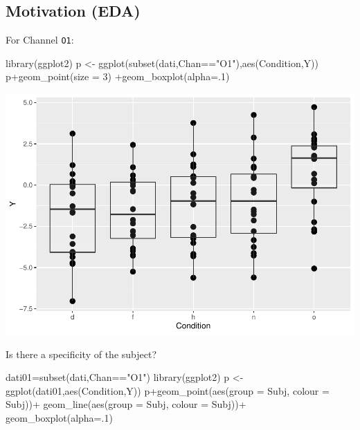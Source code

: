 \documentclass[
]{article}
\newenvironment{Shaded}{\begin{snugshade}}{\end{snugshade}}
\newcommand{\AttributeTok}[1]{\textcolor[rgb]{0.77,0.63,0.00}{#1}}
\newcommand{\DecValTok}[1]{\textcolor[rgb]{0.00,0.00,0.81}{#1}}
\newcommand{\FunctionTok}[1]{\textcolor[rgb]{0.00,0.00,0.00}{#1}}
\newcommand{\NormalTok}[1]{#1}
\newcommand{\OtherTok}[1]{\textcolor[rgb]{0.56,0.35,0.01}{#1}}
\newcommand{\SpecialCharTok}[1]{\textcolor[rgb]{0.00,0.00,0.00}{#1}}
\newcommand{\StringTok}[1]{\textcolor[rgb]{0.31,0.60,0.02}{#1}}
\begin{document}
\hypertarget{motivation-eda}{%
\subsection{Motivation (EDA)}\label{motivation-eda}}

For Channel \texttt{O1}:

\begin{Shaded}
\begin{Highlighting}[]
\FunctionTok{library}\NormalTok{(ggplot2)}
\NormalTok{p }\OtherTok{\textless{}{-}} \FunctionTok{ggplot}\NormalTok{(}\FunctionTok{subset}\NormalTok{(dati,Chan}\SpecialCharTok{==}\StringTok{"O1"}\NormalTok{),}\FunctionTok{aes}\NormalTok{(Condition,Y))}
\NormalTok{p}\SpecialCharTok{+}\FunctionTok{geom\_point}\NormalTok{(}\AttributeTok{size =} \DecValTok{3}\NormalTok{) }\SpecialCharTok{+}\FunctionTok{geom\_boxplot}\NormalTok{(}\AttributeTok{alpha=}\NormalTok{.}\DecValTok{1}\NormalTok{)}
\end{Highlighting}
\end{Shaded}

\includegraphics{perm_repeated_measures_files/figure-latex/unnamed-chunk-2-1.pdf}

Is there a specificity of the subject?

\begin{Shaded}
\begin{Highlighting}[]
\NormalTok{dati01}\OtherTok{=}\FunctionTok{subset}\NormalTok{(dati,Chan}\SpecialCharTok{==}\StringTok{"O1"}\NormalTok{)}
\FunctionTok{library}\NormalTok{(ggplot2)}
\NormalTok{p }\OtherTok{\textless{}{-}} \FunctionTok{ggplot}\NormalTok{(dati01,}\FunctionTok{aes}\NormalTok{(Condition,Y))}
\NormalTok{p}\SpecialCharTok{+}\FunctionTok{geom\_point}\NormalTok{(}\FunctionTok{aes}\NormalTok{(}\AttributeTok{group =}\NormalTok{ Subj, }\AttributeTok{colour =}\NormalTok{ Subj))}\SpecialCharTok{+}
  \FunctionTok{geom\_line}\NormalTok{(}\FunctionTok{aes}\NormalTok{(}\AttributeTok{group =}\NormalTok{ Subj, }\AttributeTok{colour =}\NormalTok{ Subj))}\SpecialCharTok{+}
   \FunctionTok{geom\_boxplot}\NormalTok{(}\AttributeTok{alpha=}\NormalTok{.}\DecValTok{1}\NormalTok{)}
\end{Highlighting}
\end{Shaded}
\end{document}
